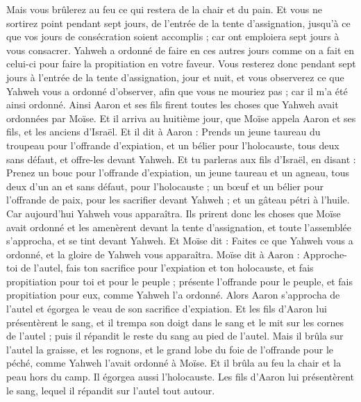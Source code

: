 \begin{multicols}{2}
Mais vous brûlerez au feu ce qui restera de la chair et du pain.
Et vous ne sortirez point pendant sept jours, de l'entrée de la tente d'assignation, jusqu'à ce que vos jours de consécration soient accomplis ; car ont emploiera sept jours à vous consacrer.
Yahweh a ordonné de faire en ces autres jours comme on a fait en celui-ci pour faire la propitiation en votre faveur.
Vous resterez donc pendant sept jours à l'entrée de la tente d'assignation, jour et nuit, et vous observerez ce que Yahweh vous a ordonné d'observer, afin que vous ne mouriez pas ; car il m'a été ainsi ordonné.
Ainsi Aaron et ses fils firent toutes les choses que Yahweh avait ordonnées par Moïse.
\VerseOne{}Et il arriva au huitième jour, que Moïse appela Aaron et ses fils, et les anciens d'Israël.
Et il dit à Aaron : Prends un jeune taureau du troupeau pour l'offrande d'expiation, et un bélier pour l'holocauste, tous deux sans défaut, et offre-les devant Yahweh.
Et tu parleras aux fils d'Israël, en disant : Prenez un bouc pour l'offrande d'expiation, un jeune taureau et un agneau, tous deux d'un an et sans défaut, pour l'holocauste ;
un bœuf et un bélier pour l'offrande de paix, pour les sacrifier devant Yahweh ; et un gâteau pétri à l'huile. Car aujourd'hui Yahweh vous apparaîtra.
Ils prirent donc les choses que Moïse avait ordonné et les amenèrent devant la tente d'assignation, et toute l'assemblée s'approcha, et se tint devant Yahweh.
Et Moïse dit : Faites ce que Yahweh vous a ordonné, et la gloire de Yahweh vous apparaîtra.
Moïse dit à Aaron : Approche-toi de l'autel, fais ton sacrifice pour l'expiation et ton holocauste, et fais propitiation pour toi et pour le peuple ; présente l'offrande pour le peuple, et fais propitiation pour eux, comme Yahweh l'a ordonné.
Alors Aaron s'approcha de l'autel et égorgea le veau de son sacrifice d'expiation.
Et les fils d'Aaron lui présentèrent le sang, et il trempa son doigt dans le sang et le mit sur les cornes de l'autel ; puis il répandit le reste du sang au pied de l'autel.
Mais il brûla sur l'autel la graisse, et les rognons, et le grand lobe du foie de l'offrande pour le péché, comme Yahweh l'avait ordonné à Moïse.
Et il brûla au feu la chair et la peau hors du camp.
Il égorgea aussi l'holocauste. Les fils d'Aaron lui présentèrent le sang, lequel il répandit sur l'autel tout autour.

\end{multicols}
